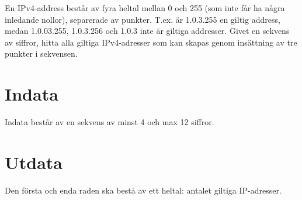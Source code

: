 En IPv4-address består av fyra heltal mellan 0 och 255 (som inte får ha några inledande nollor), separerade av punkter. T.ex. är 1.0.3.255 en giltig address, medan 1.0.03.255, 1.0.3.256 och 1.0.3 inte är giltiga addresser.
Givet en sekvens av siffror, hitta alla giltiga IPv4-adresser som kan skapas genom insättning av tre punkter i sekvensen.

\section*{Indata}
Indata består av en sekvens av minst 4 och max 12 siffror.

\section*{Utdata}
Den första och enda raden ska bestå av ett heltal: antalet giltiga IP-adresser.

